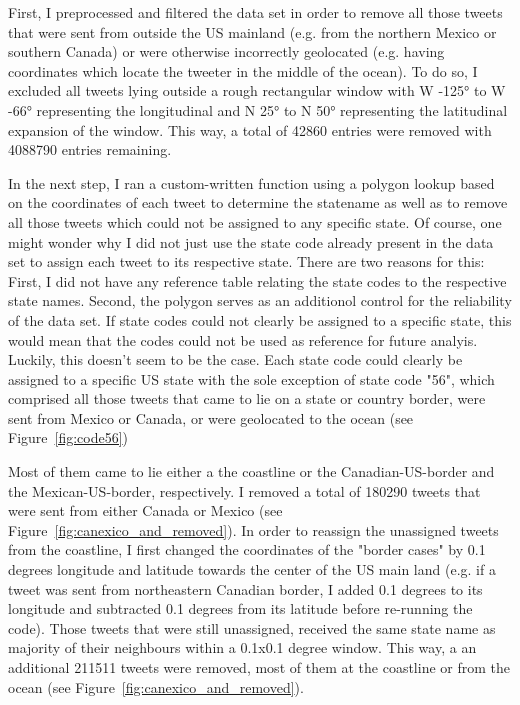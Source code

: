 \documentclass[11pt, a4paper]{article}\usepackage[]{graphicx}\usepackage[]{color}
\begin{document}
First, I preprocessed and filtered the data set in order to remove all those tweets that were sent from outside the US mainland (e.g. from the northern Mexico or southern Canada) or were otherwise incorrectly geolocated (e.g. having coordinates which locate the tweeter in the middle of the ocean). To do so, I excluded all tweets lying outside a rough rectangular window with W -125° to W -66° representing the longitudinal and N 25° to N 50° representing the latitudinal expansion of the window. This way, a total of 42860 entries were removed with 4088790 entries remaining.\newline

In the next step, I ran a custom-written function using a polygon lookup based on the coordinates of each tweet to determine the statename as well as to remove all those tweets which could not be assigned to any specific state. Of course, one might wonder why I did not just use the state code already present in the data set to assign each tweet to its respective state. There are two reasons for this: First, I did not have any reference table relating the state codes to the respective state names. Second, the polygon serves as an additionol control for the reliability of the data set. If state codes could not clearly be assigned to a specific state, this would mean that the codes could not be used as reference for future analyis. Luckily, this doesn't seem to be the case. Each state code could clearly be assigned to a specific US state with the sole exception of state code "56", which comprised all those tweets that came to lie on a state or country border, were sent from Mexico or Canada, or were geolocated to the ocean (see Figure~\ref{fig:code56})\newline

Most of them came to lie either a the coastline or the Canadian-US-border and the Mexican-US-border, respectively. I removed a total of 180290 tweets that were sent from either Canada or Mexico (see Figure~\ref{fig:canexico_and_removed}). In order to reassign the unassigned tweets from the coastline, I first changed the coordinates of the "border cases" by 0.1 degrees longitude and latitude towards the center of the US main land (e.g. if a tweet was sent from northeastern Canadian border, I added 0.1 degrees to its longitude and subtracted 0.1 degrees from its latitude before re-running the code). Those tweets that were still unassigned, received the same state name as majority of their neighbours within a 0.1x0.1 degree window. This way, a an additional 211511 tweets were removed, most of them at the coastline or from the ocean (see Figure~\ref{fig:canexico_and_removed}).\newline
\end{document}
